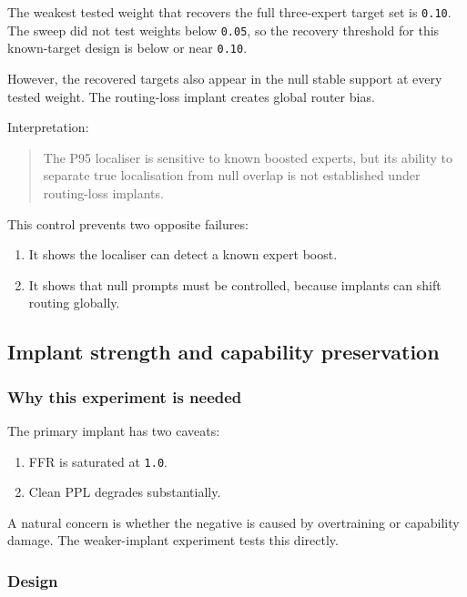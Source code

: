 \documentclass[
  11pt,
  a4paper,
]{article}
\providecommand{\tightlist}{%
  \setlength{\itemsep}{0pt}\setlength{\parskip}{0pt}}
\begin{document}
The weakest tested weight that recovers the full three-expert target set
is \texttt{0.10}. The sweep did not test weights below \texttt{0.05}, so
the recovery threshold for this known-target design is below or near
\texttt{0.10}.

However, the recovered targets also appear in the null stable support at
every tested weight. The routing-loss implant creates global router
bias.

Interpretation:

\begin{quote}
The P95 localiser is sensitive to known boosted experts, but its ability
to separate true localisation from null overlap is not established under
routing-loss implants.
\end{quote}

This control prevents two opposite failures:

\begin{enumerate}
\def\labelenumi{\arabic{enumi}.}
\tightlist
\item
  It shows the localiser can detect a known expert boost.
\item
  It shows that null prompts must be controlled, because implants can
  shift routing globally.
\end{enumerate}

\subsection{Implant strength and capability
preservation}\label{implant-strength-and-capability-preservation}

\subsubsection{Why this experiment is
needed}\label{why-this-experiment-is-needed}

The primary implant has two caveats:

\begin{enumerate}
\def\labelenumi{\arabic{enumi}.}
\tightlist
\item
  FFR is saturated at \texttt{1.0}.
\item
  Clean PPL degrades substantially.
\end{enumerate}

A natural concern is whether the negative is caused by overtraining or
capability damage. The weaker-implant experiment tests this directly.

\subsubsection{Design}\label{design}
\end{document}
